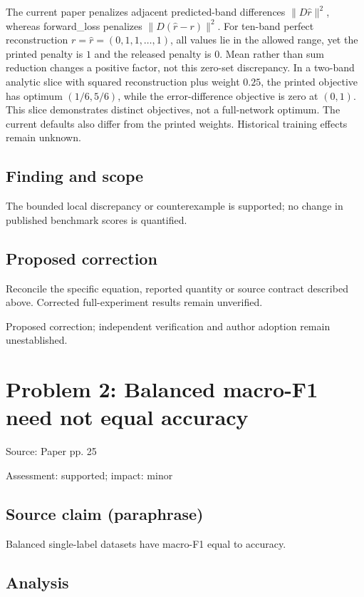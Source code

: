 \documentclass[11pt]{article}
\begin{document}
The current paper penalizes adjacent predicted-band differences \(\|D\widehat r\|^2\), whereas forward\_loss penalizes \(\|D(\widehat r-r)\|^2\). For ten-band perfect reconstruction \(r=\widehat r=(0,1,1,\ldots,1)\), all values lie in the allowed range, yet the printed penalty is \(1\) and the released penalty is \(0\). Mean rather than sum reduction changes a positive factor, not this zero-set discrepancy. In a two-band analytic slice with squared reconstruction plus weight \(0.25\), the printed objective has optimum \((1/6,5/6)\), while the error-difference objective is zero at \((0,1)\). This slice demonstrates distinct objectives, not a full-network optimum. The current defaults also differ from the printed weights. Historical training effects remain unknown.

\subsection*{Finding and scope}

The bounded local discrepancy or counterexample is supported; no change in published benchmark scores is quantified.

\subsection*{Proposed correction}

Reconcile the specific equation, reported quantity or source contract described above. Corrected full-experiment results remain unverified.

Proposed correction; independent verification and author adoption remain unestablished.

\section*{Problem 2: Balanced macro-F1 need not equal accuracy}

Source: Paper pp. 25

Assessment: supported; impact: minor

\subsection*{Source claim (paraphrase)}

Balanced single-label datasets have macro-F1 equal to accuracy.

\subsection*{Analysis}
\end{document}

